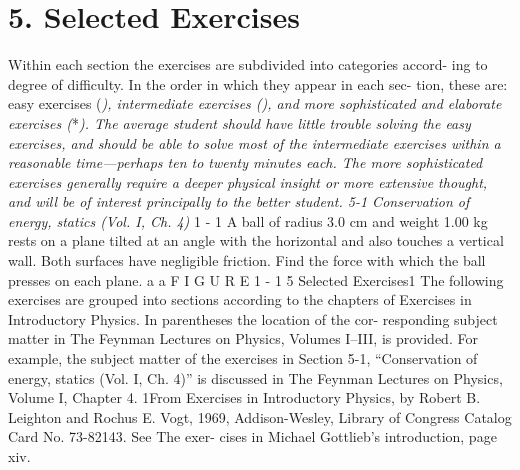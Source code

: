 \documentclass[10pt,oneside]{article}
\begin{document}
\section*{5. Selected Exercises}
\label{tips-sec-13-5-selected-exercises}
Within each section the exercises are subdivided into categories accord- ing to degree of difficulty. In the order in which they appear in each sec- tion, these are: easy exercises (\emph{), intermediate exercises (}\emph{), and more sophisticated and elaborate exercises (}*\emph{). The average student should have little trouble solving the easy exercises, and should be able to solve most of the intermediate exercises within a reasonable time---perhaps ten to twenty minutes each. The more sophisticated exercises generally require a deeper physical insight or more extensive thought, and will be of interest principally to the better student. 5-1 Conservation of energy, statics (Vol. I, Ch. 4) } 1 - 1 A ball of radius 3.0 cm and weight 1.00 kg rests on a plane tilted at an angle with the horizontal and also touches a vertical wall. Both surfaces have negligible friction. Find the force with which the ball presses on each plane. a a F I G U R E  1 - 1 5 Selected Exercises1 The following exercises are grouped into sections according to the chapters of Exercises in Introductory Physics. In parentheses the location of the cor- responding subject matter in The Feynman Lectures on Physics, Volumes I–III, is provided. For example, the subject matter of the exercises in Section 5-1, “Conservation of energy, statics (Vol. I, Ch. 4)” is discussed in The Feynman Lectures on Physics, Volume I, Chapter 4. 1From Exercises in Introductory Physics, by Robert B. Leighton and Rochus E. Vogt, 1969, Addison-Wesley, Library of Congress Catalog Card No. 73-82143. See The exer- cises in Michael Gottlieb’s introduction, page xiv.\par
\end{document}
